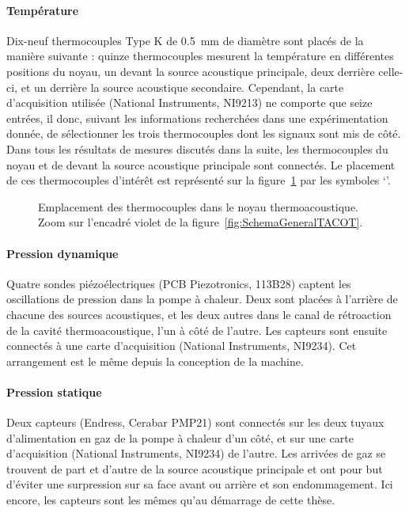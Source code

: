 \paragraph{Température} Dix-neuf thermocouples Type K de \qty{.5}{\milli\meter} de diamètre sont placés de la manière suivante : quinze thermocouples mesurent la température en différentes positions du noyau, un devant la source acoustique principale, deux derrière celle-ci, et un derrière la source acoustique secondaire. Cependant, la carte d'acquisition utilisée (National Instruments, NI9213) ne comporte que seize entrées, il  donc, suivant les informations recherchées dans une expérimentation donnée, de sélectionner les trois thermocouples dont les signaux sont mis de côté. Dans tous les résultats de mesures discutés dans la suite, les thermocouples du noyau et de devant la source acoustique principale sont connectés. Le placement de ces thermocouples d'intérêt est représenté sur la figure~\ref{fig:TCdansNoyau} par les symboles `\textcolor{cyan}{\textbullet}'.

\begin{figure}[!ht]
    \centering
    
    \caption{Emplacement des thermocouples dans le noyau thermoacoustique. Zoom sur l'encadré violet de la figure~\ref{fig:SchemaGeneralTACOT}.}
    \label{fig:TCdansNoyau}
\end{figure}

\paragraph{Pression dynamique} Quatre sondes piézoélectriques (PCB Piezotronics, 113B28) captent les oscillations de pression dans la pompe à chaleur. Deux sont placées à l'arrière de chacune des sources acoustiques, et les deux autres dans le canal de rétroaction de la cavité thermoacoustique, l'un à côté de l'autre. Les capteurs sont ensuite connectés à une carte d'acquisition (National Instruments, NI9234). Cet arrangement est le même depuis la conception de la machine.

\paragraph{Pression statique} Deux capteurs (Endress, Cerabar PMP21) sont connectés sur les deux tuyaux d'alimentation en gaz de la pompe  à chaleur d'un côté, et sur une carte d'acquisition (National Instruments, NI9234) de l'autre. Les arrivées de gaz se trouvent de part et d'autre de la source acoustique principale et ont pour but d'éviter une surpression sur sa face avant ou arrière et son endommagement. Ici encore, les capteurs sont les mêmes qu'au démarrage de cette thèse.

